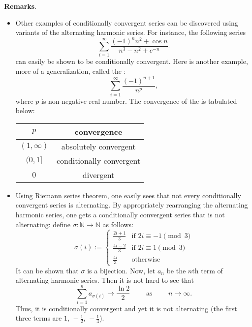 \documentclass[12pt]{article}
\begin{document}
\textbf{Remarks}.  
\begin{itemize}
\item
Other examples of conditionally convergent series can be discovered using variants of the alternating harmonic series.  For instance, the following series
$$ \sum_{i=1}^{\infty} \frac{(-1)^n n^2+\cos n}{n^3-n^2+e^{-n}}. $$
can easily be shown to be conditionally convergent.  Here is another example, more of a generalization, called the :
\begin{equation}
\sum_{i=1}^{\infty} \frac{(-1)^{n+1}}{n^p},
\end{equation}
where $p$ is non-negative real number.  The convergence of the  is tabulated below:
\begin{center}
\begin{tabular}{|c|c|}
\hline
$p$ & convergence \\
\hline\hline
$(1,\infty)$ & absolutely convergent \\
\hline
$(0,1]$ & conditionally convergent \\
\hline
$0$ & divergent \\ 
\hline
\end{tabular}
\end{center}
\item
Using Riemann series theorem, one easily sees that not every conditionally convergent series is alternating.  By appropriately rearranging the alternating harmonic series, one gets a conditionally convergent series that is not alternating:
define $\sigma:\mathbb{N}\to \mathbb{N}$ as follows:
\begin{displaymath}
\sigma(i):=\left \{
\begin{array}{ll}
\displaystyle{\frac{2i+1}{3}} & \textrm{if }2i\equiv -1 \pmod 3\\
\displaystyle{\frac{4i-2}{3}} & \textrm{if }2i\equiv 1 \pmod 3\\
\displaystyle{\frac{4i}{3}} & \textrm{otherwise}
\end{array}
\right.
\end{displaymath}
It can be shown that $\sigma$ is a bijection.  Now, let $a_n$ be the $n$th term of alternating harmonic series.  Then it is not hard to see that $$\sum_{i=1}^n a_{\sigma(i)}\longrightarrow \frac{\ln 2}{2}\qquad\mbox{ as } \qquad n \longrightarrow \infty.$$
Thus, it is conditionally convergent and yet it is not alternating (the first three terms are $1,\,-\frac{1}{2},\,-\frac{1}{4}$).
\end{itemize}
\end{document}
